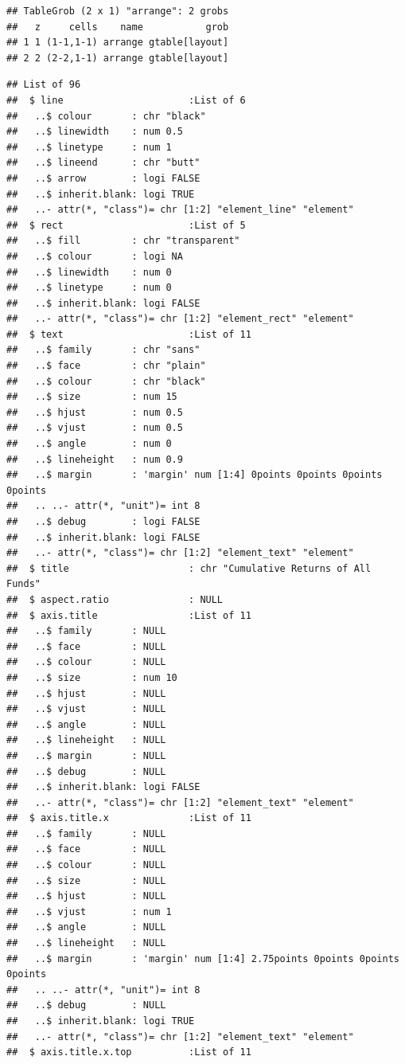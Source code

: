 \documentclass[12pt,preprint, authoryear]{elsarticle}
\numberwithin{equation}{section}
\numberwithin{figure}{section}
\numberwithin{table}{section}
\begin{document}
\begin{verbatim}
## TableGrob (2 x 1) "arrange": 2 grobs
##   z     cells    name           grob
## 1 1 (1-1,1-1) arrange gtable[layout]
## 2 2 (2-2,1-1) arrange gtable[layout]
\end{verbatim}

\begin{verbatim}
## List of 96
##  $ line                      :List of 6
##   ..$ colour       : chr "black"
##   ..$ linewidth    : num 0.5
##   ..$ linetype     : num 1
##   ..$ lineend      : chr "butt"
##   ..$ arrow        : logi FALSE
##   ..$ inherit.blank: logi TRUE
##   ..- attr(*, "class")= chr [1:2] "element_line" "element"
##  $ rect                      :List of 5
##   ..$ fill         : chr "transparent"
##   ..$ colour       : logi NA
##   ..$ linewidth    : num 0
##   ..$ linetype     : num 0
##   ..$ inherit.blank: logi FALSE
##   ..- attr(*, "class")= chr [1:2] "element_rect" "element"
##  $ text                      :List of 11
##   ..$ family       : chr "sans"
##   ..$ face         : chr "plain"
##   ..$ colour       : chr "black"
##   ..$ size         : num 15
##   ..$ hjust        : num 0.5
##   ..$ vjust        : num 0.5
##   ..$ angle        : num 0
##   ..$ lineheight   : num 0.9
##   ..$ margin       : 'margin' num [1:4] 0points 0points 0points 0points
##   .. ..- attr(*, "unit")= int 8
##   ..$ debug        : logi FALSE
##   ..$ inherit.blank: logi FALSE
##   ..- attr(*, "class")= chr [1:2] "element_text" "element"
##  $ title                     : chr "Cumulative Returns of All Funds"
##  $ aspect.ratio              : NULL
##  $ axis.title                :List of 11
##   ..$ family       : NULL
##   ..$ face         : NULL
##   ..$ colour       : NULL
##   ..$ size         : num 10
##   ..$ hjust        : NULL
##   ..$ vjust        : NULL
##   ..$ angle        : NULL
##   ..$ lineheight   : NULL
##   ..$ margin       : NULL
##   ..$ debug        : NULL
##   ..$ inherit.blank: logi FALSE
##   ..- attr(*, "class")= chr [1:2] "element_text" "element"
##  $ axis.title.x              :List of 11
##   ..$ family       : NULL
##   ..$ face         : NULL
##   ..$ colour       : NULL
##   ..$ size         : NULL
##   ..$ hjust        : NULL
##   ..$ vjust        : num 1
##   ..$ angle        : NULL
##   ..$ lineheight   : NULL
##   ..$ margin       : 'margin' num [1:4] 2.75points 0points 0points 0points
##   .. ..- attr(*, "unit")= int 8
##   ..$ debug        : NULL
##   ..$ inherit.blank: logi TRUE
##   ..- attr(*, "class")= chr [1:2] "element_text" "element"
##  $ axis.title.x.top          :List of 11

\end{verbatim}
\end{document}
